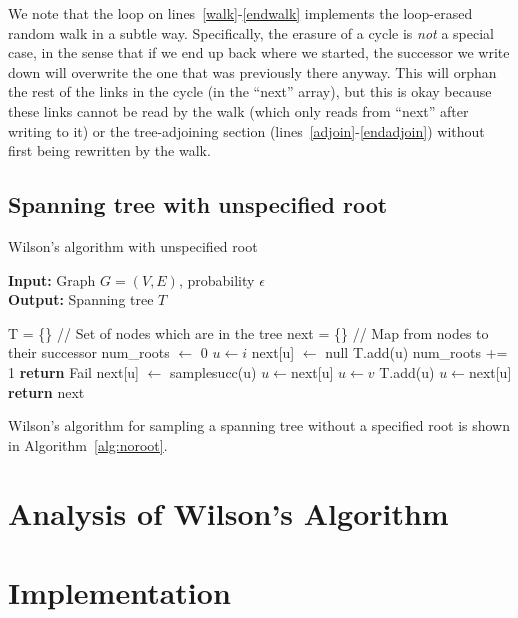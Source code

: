 \documentclass[11pt]{article}
\begin{document}
We note that the loop on lines~\ref{walk}-\ref{endwalk} implements the
loop-erased random walk in a subtle way.  Specifically, the erasure of a cycle is
\emph{not} a special case, in the sense that if we end up back where we started,
the successor we write down will overwrite the one that was previously there
anyway. This will orphan the rest of the links in the cycle (in the ``next''
array), but this is okay because these links cannot be read by the walk (which only
reads from ``next'' after writing to it) or the tree-adjoining section
(lines~\ref{adjoin}-\ref{endadjoin}) without first being rewritten by the
walk.

\subsection{Spanning tree with unspecified root}
\begin{algorithm}
\caption{Wilson's algorithm with unspecified root}
\label{alg:noroot}
\textbf{Input: }Graph $G=(V,E)$, probability $\epsilon$ \\
\textbf{Output: }Spanning tree $T$ \\
\begin{algorithmic}
\STATE T = \{\}                   // Set of nodes which are in the tree
\STATE next = \{\}                // Map from nodes to their successor
\STATE num\_roots $\leftarrow$ 0
\STATE $u \leftarrow i$
\STATE next[u] $\leftarrow$ null
\STATE T.add(u)
\STATE num\_roots += 1
\STATE \textbf{return} Fail
\ENDIF
\ELSE
\STATE next[u] $\leftarrow$ samplesucc(u)
\STATE $u \leftarrow $next[u]
\ENDIF
\STATE $u \leftarrow v$
\ENDWHILE
{} \label{adjoin}
\STATE T.add(u)
\STATE $u \leftarrow $next[u]
\ENDWHILE
\ENDFOR
\STATE \textbf{return} next
\end{algorithmic}
\end{algorithm}

Wilson's algorithm for sampling a spanning tree without a specified root is
shown in Algorithm~\ref{alg:noroot}.

\section{Analysis of Wilson's Algorithm}


\section{Implementation}\label{imp}
\end{document}

